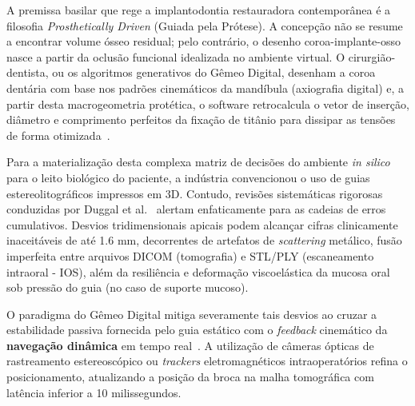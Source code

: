 A premissa basilar que rege a implantodontia restauradora contemporânea é a filosofia \textit{Prosthetically Driven} (Guiada pela Prótese). A concepção não se resume a encontrar volume ósseo residual; pelo contrário, o desenho coroa-implante-osso nasce a partir da oclusão funcional idealizada no ambiente virtual. O cirurgião-dentista, ou os algoritmos generativos do Gêmeo Digital, desenham a coroa dentária com base nos padrões cinemáticos da mandíbula (axiografia digital) e, a partir desta macrogeometria protética, o software retrocalcula o vetor de inserção, diâmetro e comprimento perfeitos da fixação de titânio para dissipar as tensões de forma otimizada~\cite{roy2025applications}.

Para a materialização desta complexa matriz de decisões do ambiente \textit{in silico} para o leito biológico do paciente, a indústria convencionou o uso de guias estereolitográficos impressos em 3D. Contudo, revisões sistemáticas rigorosas conduzidas por Duggal et al.~\cite{duggal2026exploring} alertam enfaticamente para as cadeias de erros cumulativos. Desvios tridimensionais apicais podem alcançar cifras clinicamente inaceitáveis de até 1.6 mm, decorrentes de artefatos de \textit{scattering} metálico, fusão imperfeita entre arquivos DICOM (tomografia) e STL/PLY (escaneamento intraoral - IOS), além da resiliência e deformação viscoelástica da mucosa oral sob pressão do guia (no caso de suporte mucoso). 

O paradigma do Gêmeo Digital mitiga severamente tais desvios ao cruzar a estabilidade passiva fornecida pelo guia estático com o \textit{feedback} cinemático da \textbf{navegação dinâmica} em tempo real~\cite{khoshfekr2025review}. A utilização de câmeras ópticas de rastreamento estereoscópico ou \textit{trackers} eletromagnéticos intraoperatórios refina o posicionamento, atualizando a posição da broca na malha tomográfica com latência inferior a 10 milissegundos. 

